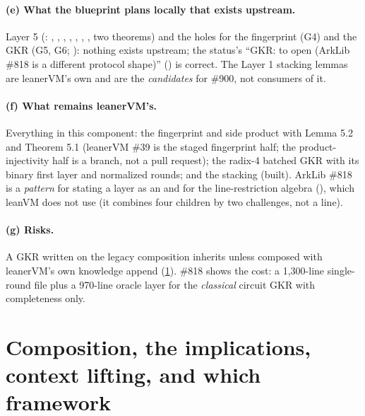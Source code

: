\paragraph{(e) What the blueprint plans locally that exists upstream.}
Layer 5 (: , ,
, , , ,
, two theorems) and the holes for the fingerprint (G4) and the GKR (G5, G6;
): nothing exists upstream; the status's ``GKR: to open (ArkLib \#818 is a
different protocol shape)'' () is correct. The Layer 1 stacking lemmas are
leanerVM's own and are the \emph{candidates} for \#900, not consumers of it.

\paragraph{(f) What remains leanerVM's.}
Everything in this component: the fingerprint and side product with Lemma 5.2 and Theorem 5.1
(leanerVM \#39 is the staged fingerprint half; the product-injectivity half is a branch, not a
pull request); the radix-4 batched GKR with its binary first layer and normalized rounds; and
the stacking (built). ArkLib \#818 is a \emph{pattern} for stating a layer as an
 and for the line-restriction algebra
(), which leanVM does not use (it combines four
children by two challenges, not a line).

\paragraph{(g) Risks.}
A GKR written on the legacy composition inherits  unless composed with leanerVM's
own knowledge append (\cref{sec:ark-composition}). \#818 shows the cost: a 1,300-line
single-round file plus a 970-line oracle layer for the \emph{classical} circuit GKR with
completeness only.

\section{Composition, the implications, context lifting, and which framework}\label{sec:ark-composition}

